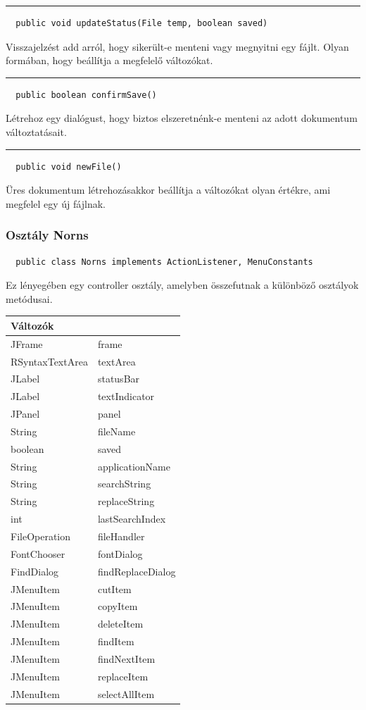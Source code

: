 \documentclass[12pt]{article}
\newcommand{\vonal}{\noindent\rule{\textwidth}{1pt}}
\begin{document}
\vonal
\begin{lstlisting}
  public void updateStatus(File temp, boolean saved)
\end{lstlisting}
Visszajelzést add arról, hogy sikerült-e menteni vagy megnyitni egy fájlt.
Olyan formában, hogy beállítja a megfelelő változókat.

\vonal
\begin{lstlisting}
  public boolean confirmSave()
\end{lstlisting}
Létrehoz egy dialógust, hogy biztos elszeretnénk-e menteni az adott dokumentum
változtatásait.

\vonal
\begin{lstlisting}
  public void newFile()
\end{lstlisting}
Üres dokumentum létrehozásakkor beállítja a változókat olyan értékre, ami
megfelel egy új fájlnak.

\subsubsection*{Osztály Norns}
\begin{lstlisting}
  public class Norns implements ActionListener, MenuConstants
\end{lstlisting}
Ez lényegében egy controller osztály, amelyben összefutnak a különböző osztályok
metódusai.

\begin{longtable}{|p{5cm}|p{10cm}|} \hline
    \multicolumn{2}{|p{15cm}|}{\textbf{Változók}}  \\ \hline
    JFrame & frame \\ \hline
    RSyntaxTextArea & textArea \\ \hline
    JLabel & statusBar \\ \hline
    JLabel & textIndicator \\ \hline
    JPanel & panel \\ \hline
    String & fileName \\ \hline
    boolean & saved \\ \hline
    String & applicationName \\ \hline
    String & searchString \\ \hline
    String & replaceString \\ \hline
    int & lastSearchIndex \\ \hline
    FileOperation & fileHandler \\ \hline
    FontChooser & fontDialog \\ \hline
    FindDialog & findReplaceDialog \\ \hline
    JMenuItem & cutItem \\ \hline
    JMenuItem & copyItem \\ \hline
    JMenuItem & deleteItem \\ \hline
    JMenuItem & findItem \\ \hline
    JMenuItem & findNextItem \\ \hline
    JMenuItem & replaceItem \\ \hline
    JMenuItem & selectAllItem \\ \hline
\end{longtable}
\end{document}
